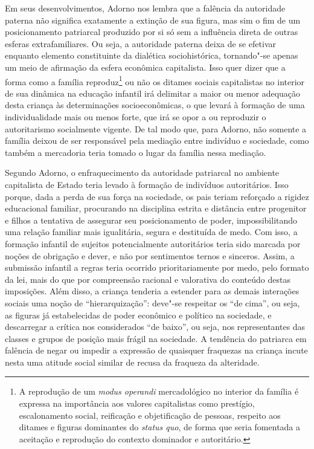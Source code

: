 Em seus desenvolvimentos, Adorno nos lembra que a falência da autoridade
paterna não significa exatamente a extinção de sua figura, mas sim o fim
de um posicionamento patriarcal produzido por si só sem a influência
direta de outras esferas extrafamiliares. Ou seja, a autoridade paterna
deixa de se efetivar enquanto elemento constituinte da dialética
sociohistórica, tornando"-se apenas um meio de afirmação da esfera
econômica capitalista. Isso quer dizer que a forma como a família
reproduz\footnote{A reprodução de um \emph{modus operandi} mercadológico
  no interior da família é expressa na importância aos valores
  capitalistas como prestígio, escalonamento social, reificação e
  objetificação de pessoas, respeito aos ditames e figuras dominantes do
  \emph{status quo}, de forma que seria fomentada a aceitação e
  reprodução do contexto dominador e autoritário.} ou não os ditames
sociais capitalistas no interior de sua dinâmica na educação infantil
irá delimitar a maior ou menor adequação desta criança às determinações
socioeconômicas, o que levará à formação de uma individualidade mais ou
menos forte, que irá se opor a ou reproduzir o autoritarismo socialmente
vigente. De tal modo que, para Adorno, não somente a família deixou de
ser responsável pela mediação entre indivíduo e sociedade, como também a
mercadoria teria tomado o lugar da família nessa mediação.

Segundo Adorno, o enfraquecimento da autoridade patriarcal no ambiente
capitalista de Estado teria levado à formação de indivíduos
autoritários. Isso porque, dada a perda de sua força na sociedade, os
pais teriam reforçado a rigidez educacional familiar, procurando na
disciplina estrita e distância entre progenitor e filhos a tentativa de
assegurar seu posicionamento de poder, impossibilitando uma relação
familiar mais igualitária, segura e destituída de medo. Com isso, a
formação infantil de sujeitos potencialmente autoritários teria sido
marcada por noções de obrigação e dever, e não por sentimentos ternos e
sinceros. Assim, a submissão infantil a regras teria ocorrido
prioritariamente por medo, pelo formato da lei, mais do que por
compreensão racional e valorativa do conteúdo destas imposições. Além
disso, a criança tenderia a estender para as demais interações sociais
uma noção de ``hierarquização'': deve"-se respeitar os ``de cima'', ou
seja, as figuras já estabelecidas de poder econômico e político na
sociedade, e descarregar a crítica nos considerados ``de baixo'', ou
seja, nos representantes das classes e grupos de posição mais frágil na
sociedade. A tendência do patriarca em falência de negar ou impedir a
expressão de quaisquer fraquezas na criança incute nesta uma atitude
social similar de recusa da fraqueza da alteridade.

